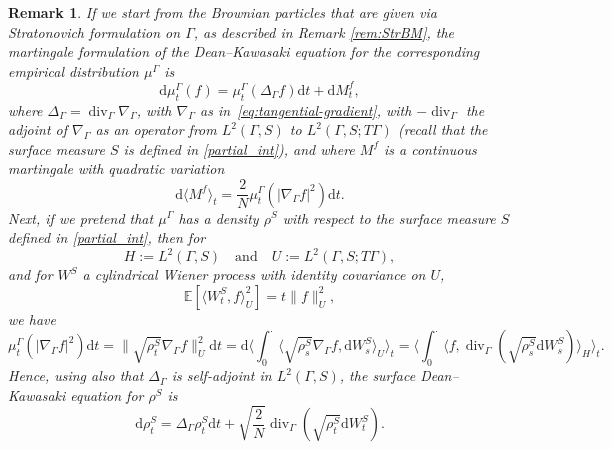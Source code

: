 \documentclass[11pt, a4paper]{article}
\newcommand{\mathd}{\mathrm{d}}
\newtheorem{remark}[theorem]{Remark}%
\begin{document}
\begin{remark}
    If we start from the Brownian particles that are given via Stratonovich formulation on $\Gamma$, as described in Remark \ref{rem:StrBM}, the martingale formulation of the Dean--Kawasaki equation for the corresponding empirical distribution $\mu^{\Gamma}$ is
    \[
    \mathd\mu_t^{\Gamma}(f)=\mu_t^{\Gamma}(\Delta_\Gamma f) \mathd t + \mathd M_t^f,
    \]
    where $\Delta_\Gamma = \operatorname{div}_\Gamma \nabla_\Gamma$, with $\nabla_\Gamma$ as in~\eqref{eq:tangential-gradient}, with $-\operatorname{div}_\Gamma$ the adjoint of $\nabla_\Gamma$ as an operator from $L^2(\Gamma, S)$ to $L^2(\Gamma, S; T\Gamma)$ (recall that the surface measure $S$ is defined in \eqref{partial_int}), and
    where $M^f$ is a continuous martingale with quadratic variation
    \[
     \mathd \langle M^{f} \rangle_t = \frac{2}{N}\mu^{\Gamma}_t(|\nabla_\Gamma f|^2)\mathd t .
    \]
    Next, if we pretend that $\mu^\Gamma$ has a density $\rho^S$ with respect to the surface measure $S$ defined in \eqref{partial_int}, then for
    \[
        H:=L^2(\Gamma,S) \quad  \text{and}\quad U := L^2(\Gamma,S;T\Gamma),
    \]
    and for $W^S$ a cylindrical Wiener process with identity covariance on $U$,
    \[
        \mathbb{E}[\langle W_t^S, f\rangle_U^2]=t\|f\|_U^2,
    \]
    we have
    \[
        \mu^{\Gamma}_t(|\nabla_\Gamma f|^2) \mathd t = \|\sqrt{\rho_t^S}\nabla_\Gamma f\|^2_U \mathd t =\mathd \langle\int_0^\cdot \langle\sqrt{\rho_s^S}\nabla_\Gamma f, \mathd W_s^S\rangle_U
\rangle_t=\langle\int_0^\cdot \langle f, \operatorname{div}_\Gamma \left(\sqrt{\rho_s^S}\mathd W_s^S \right)\rangle_H\rangle_t.
    \]
Hence, using also that $\Delta_\Gamma$ is self-adjoint in $L^2(\Gamma, S)$, the surface Dean--Kawasaki equation for $\rho^S$ is
\[
\mathd \rho^S_t=\Delta_\Gamma \rho_t^S \mathd t +\sqrt{\frac2N}\operatorname{div}_\Gamma\left( \sqrt{\rho^S_t}\mathd W_t^S\right).
\]
  
\end{remark}
\end{document}
